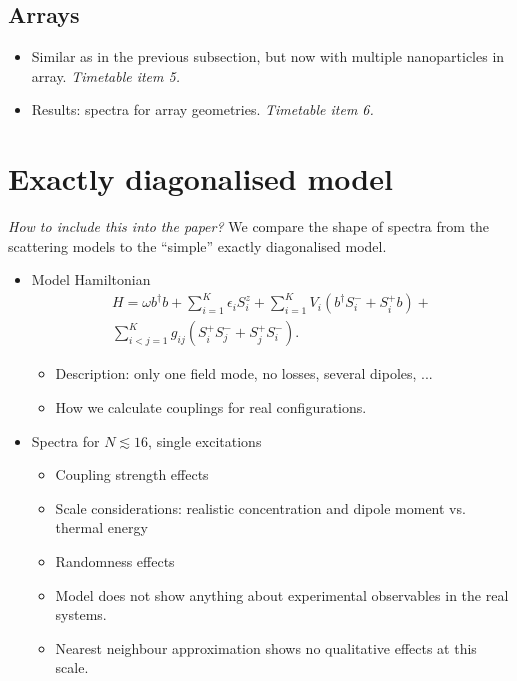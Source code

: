 \documentclass[pra,superscriptaddress,twocolumn,notitlepage,showpacs]{revtex4-1}
\begin{document}
\subsection*{Arrays}
\begin{itemize}
\item Similar as in the previous subsection, but now with multiple nanoparticles
in array. \emph{Timetable item 5.}
\item Results: spectra for array geometries. \emph{Timetable item 6.}
\end{itemize}

\section*{Exactly diagonalised model}

\emph{How to include this into the paper? }We compare the shape of
spectra from the scattering models to the ``simple'' exactly diagonalised
model.
\begin{itemize}
\item Model Hamiltonian
    \begin{multline}
H=\omega b^{\dagger}b+\sum_{i=1}^{K}\epsilon_{i}S_{i}^{z}+\sum_{i=1}^{K}V_{i}\left(b^{\dagger}S_{i}^{-}+S_{i}^{+}b\right)+\\\sum_{i<j=1}^{K}g_{ij}\left(S_{i}^{+}S_{j}^{-}+S_{j}^{+}S_{i}^{-}\right).
\end{multline}


\begin{itemize}
\item Description: only one field mode, no losses, several dipoles, ...
\item How we calculate couplings for real configurations.
\end{itemize}
\item Spectra for $N\lesssim16$, single excitations

\begin{itemize}
\item Coupling strength effects
\item Scale considerations: realistic concentration and dipole moment vs.
thermal energy
\item Randomness effects
\item Model does not show anything about experimental observables in the
real systems.
\item Nearest neighbour approximation shows no qualitative effects at this
scale.
\end{itemize}
\end{itemize}
\end{document}
